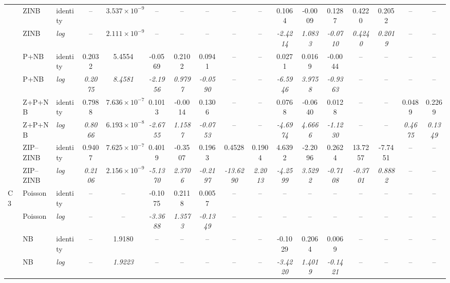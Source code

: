 \begin{table}
{\begin{tabular}{l l l c c c c c c c c c c c c c c}
 & ZINB & identity & -- & $3.537\times10^{-9}$ & -- & -- & -- & -- & -- & 0.1064 & -0.0009 & 0.1287 & 0.4220 & 0.2052 & -- & -- \\
 & ZINB & \textit{log} & -- & $\mathit{2.111\times10^{-9}}$ & -- & -- & -- & -- & -- & \textit{-2.4214} & \textit{1.0833} & \textit{-0.0710} & \textit{0.4240} & \textit{0.2019} & -- & -- \\

 & P+NB & identity & 0.2032 & 5.4554 & -0.0569 & 0.2102 & 0.0941 & -- & -- & 0.0271 & 0.0169 & -0.0044 & -- & -- & -- & -- \\
 & P+NB & \textit{log} & \textit{0.2075} & \textit{8.4581} & \textit{-2.1956} & \textit{0.9797} & \textit{-0.0590} & -- & -- & \textit{-6.5946} & \textit{3.9758} & \textit{-0.9363} & -- & -- & -- & -- \\

 & Z+P+NB & identity & 0.7988 & $7.636\times10^{-7}$ & 0.1013 & -0.0014 & 0.1306 & -- & -- & 0.0768 & -0.0640 & 0.0128 & -- & -- & 0.0489 & 0.2269 \\
 & Z+P+NB & \textit{log} & \textit{0.8066} & $\mathit{6.193\times10^{-8}}$ & \textit{-2.6755} & \textit{1.1587} & \textit{-0.0753} & -- & -- & \textit{-4.6974} & \textit{4.6666} & \textit{-1.1230} & -- & -- & \textit{0.4675} & \textit{0.1349} \\

 & ZIP--ZINB & identity & 0.9407 & $7.625\times10^{-7}$ & 0.4019 & -0.3507 & 0.1963 & 0.4528 & 0.1904 & 4.6392 & -2.2096 & 0.2624 & 13.7257 & -7.7451 & -- & -- \\
 & ZIP--ZINB & \textit{log} & \textit{0.2106} & $\mathit{2.156\times10^{-9}}$ & \textit{-5.1370} & \textit{2.3706} & \textit{-0.2197} & \textit{-13.6290} & \textit{2.2013} & \textit{-4.2599} & \textit{3.5292} & \textit{-0.7108} & \textit{-0.3701} & \textit{0.8882} & -- & -- \\

\midrule

\multirow{14}{*}{C3} & Poisson & identity & -- & -- & -0.1075 & 0.2118 & 0.0057 & -- & -- & -- & -- & -- & -- & -- & -- & -- \\
 & Poisson & \textit{log} & -- & -- & \textit{-3.3688} & \textit{1.3573} & \textit{-0.1349} & -- & -- & -- & -- & -- & -- & -- & -- & -- \\

 & NB & identity & -- & 1.9180 & -- & -- & -- & -- & -- & -0.1029 & 0.2064 & 0.0069 & -- & -- & -- & -- \\
 & NB & \textit{log} & -- & \textit{1.9223} & -- & -- & -- & -- & -- & \textit{-3.4220} & \textit{1.4019} & \textit{-0.1421} & -- & -- & -- & -- \\


\end{tabular}}
\end{table}
